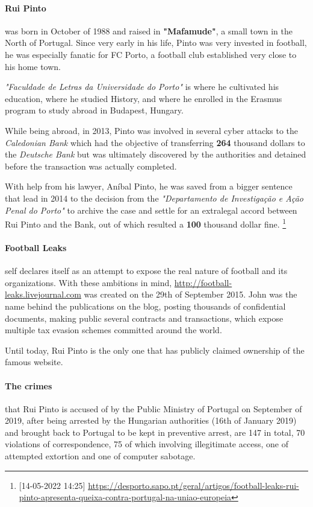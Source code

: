 \paragraph{Rui Pinto}
was born in October of 1988 and raised in \textbf{"Mafamude"}, a small town in the North of Portugal.
Since very early in his life, Pinto was very invested in football, he was especially fanatic for FC Porto, a football club established very close to his home town.

\textit{"Faculdade de Letras da Universidade do Porto"} is where he cultivated his education, where he studied History, and where he enrolled in the Erasmus program to study abroad in Budapest, Hungary.

While being abroad, in 2013, Pinto was involved in several cyber attacks to the \textit{Caledonian Bank} which had the objective of transferring \textbf{264} thousand dollars to the \textit{Deutsche Bank} but was ultimately discovered by the authorities and detained before the transaction was actually completed.

With help from his lawyer, Aníbal Pinto, he was saved from a bigger sentence that lead in 2014 to the decision from the \textit{"Departamento de Investigação e Ação Penal do Porto"} to archive the case and settle for an extralegal accord between Rui Pinto and the Bank, out of which resulted a \textbf{100} thousand dollar fine.
\footnote{[14-05-2022 14:25] \url{https://desporto.sapo.pt/geral/artigos/football-leaks-rui-pinto-apresenta-queixa-contra-portugal-na-uniao-europeia}}


\paragraph{Football Leaks} self declares itself as an attempt to expose the real nature of football and its organizations.
With these ambitions in mind, \url{http://football-leaks.livejournal.com} was created on the 29th of September 2015.
John was the name behind the publications on the blog, posting thousands of confidential documents, making public several contracts and transactions, which expose multiple tax evasion schemes committed around the world.

Until today, Rui Pinto is the only one that has publicly claimed ownership of the famous website.

\paragraph{The crimes} that Rui Pinto is accused of by the Public Ministry of Portugal on September of 2019, after being arrested by the Hungarian authorities (16th of January 2019) and brought back to Portugal to be kept in preventive arrest, are 147 in total, 70 violations of correspondence, 75 of which involving illegitimate access, one of attempted extortion and one of computer sabotage.

